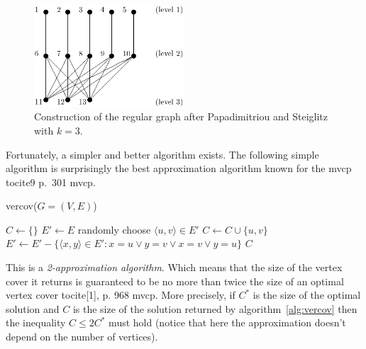 \documentclass[12pt]{article}
\begin{document}
\begin{figure}[!htbp]
\centering
\includegraphics[width=0.5\textwidth]{ps}
\caption[The regular graph after Papadimitriou
and Steiglitz]{Construction of the regular graph after Papadimitriou
and Steiglitz with $k=3$.}
\label{fig:ps}
\end{figure}

Fortunately, a simpler and better algorithm exists.
The following simple algorithm is surprisingly the
best approximation algorithm known for the mvcp
tocite{9 p.~301 mvcp}.

\begin{algorithm}
\caption{vercov($G = (V, E)$)}
\label{alg:vercov}
\begin{algorithmic}[1]

\State $C \gets \{ \}$
\State $E' \gets E$
\State randomly choose $ \langle u, v \rangle \in E'$
\label{alg:rand}
\State $C \gets C \cup \{u, v\}$
\State $E' \gets E' -
\{ \langle x, y \rangle \in E' : x=u \vee y=v \vee x=v \vee y=u \}$
\State {}
\EndWhile
\State \Return $C$

\end{algorithmic}
\end{algorithm}

This is a \textit{2-approximation algorithm}. Which means that
the size of the vertex cover
it returns is guaranteed to be no more than twice the
size of an optimal vertex cover tocite{[1], p. 968 mvcp}.
More precisely, if $C^*$ is the size of the optimal
solution and $C$ is the size of the solution returned by algorithm~\ref{alg:vercov}
then the inequality $C \leq 2C^*$ must hold (notice that here the approximation
doesn't depend on the number of vertices).
\end{document}
